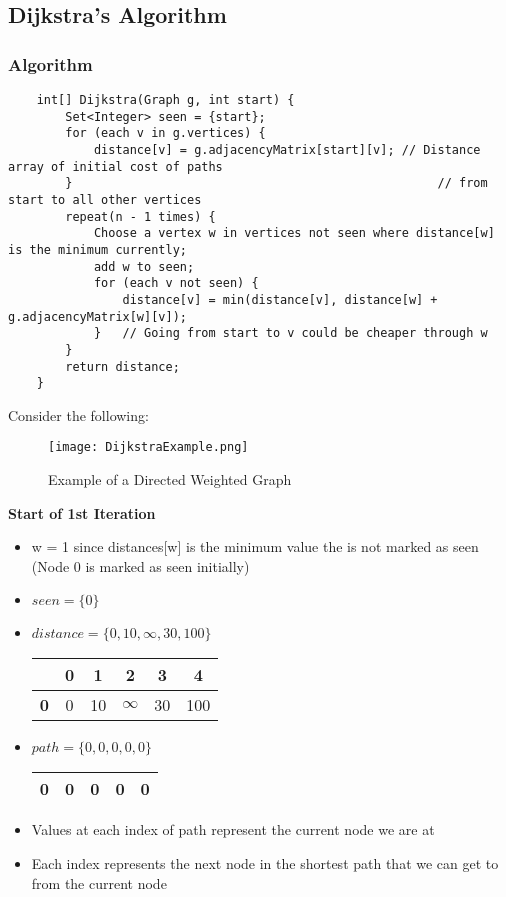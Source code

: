 \documentclass[10pt, 
a4paper, 
oneside, 
headinclude, footinclude, 
BCOR5mm]
{scrartcl}
\begin{document}
\subsection{Dijkstra's Algorithm}
\subsubsection{Algorithm}
\begin{lstlisting}
    int[] Dijkstra(Graph g, int start) {
        Set<Integer> seen = {start};
        for (each v in g.vertices) {
            distance[v] = g.adjacencyMatrix[start][v]; // Distance array of initial cost of paths 
        }                                                   // from start to all other vertices
        repeat(n - 1 times) {
            Choose a vertex w in vertices not seen where distance[w] is the minimum currently;
            add w to seen; 
            for (each v not seen) {
                distance[v] = min(distance[v], distance[w] + g.adjacencyMatrix[w][v]);
            }   // Going from start to v could be cheaper through w
        }
        return distance;
    }
\end{lstlisting}
Consider the following:
\begin{figure}[H]
    \begin{center}
        \texttt{[image: DijkstraExample.png]}
        \caption{Example of a Directed Weighted Graph}
    \end{center}
\end{figure}
\textbf{Start of 1st Iteration}
\begin{itemize}
    \item w = 1 since distances[w] is the minimum value the is not marked as seen (Node 0 is marked as seen initially)
    \item $seen = \{0\}$
    \item $distance = \{0,10,\infty,30,100\}$
    \begin{center}
        \begin{tabular}{|c|c|c|c|c|c|}
            \hline
            & \textbf{0} & \textbf{1} & \textbf{2} & \textbf{3} & \textbf{4} \\
            \hline
            \textbf{0} & 0 & 10 & $\infty$ & 30 & 100 \\
            \hline
        \end{tabular}
    \end{center}
    \item $path = \{0,0,0,0,0\}$
    \begin{center}
        \begin{tabular}{|c|c|c|c|c|}
            \hline
            0 & 0 & 0 & 0 & 0 \\
            \hline
        \end{tabular}
    \end{center}
    \item Values at each index of path represent the current node we are at
    \item Each index represents the next node in the shortest path that we can get to from the current node
\end{itemize}
\end{document}
